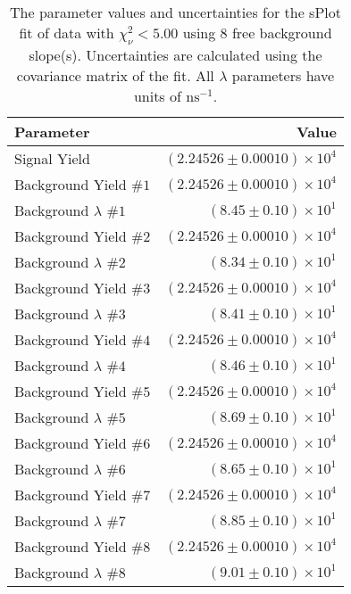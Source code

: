 
\begin{table}
    \begin{center}
        \begin{tabular}{lr}\toprule
            Parameter & Value \\\midrule
            Signal Yield & $(2.24526 \pm 0.00010) \times 10^{4}$ \\
            Background Yield $\#1$ & $(2.24526 \pm 0.00010) \times 10^{4}$ \\
            Background $\lambda$ $\#1$ & $(8.45 \pm 0.10) \times 10^{1}$ \\
            Background Yield $\#2$ & $(2.24526 \pm 0.00010) \times 10^{4}$ \\
            Background $\lambda$ $\#2$ & $(8.34 \pm 0.10) \times 10^{1}$ \\
            Background Yield $\#3$ & $(2.24526 \pm 0.00010) \times 10^{4}$ \\
            Background $\lambda$ $\#3$ & $(8.41 \pm 0.10) \times 10^{1}$ \\
            Background Yield $\#4$ & $(2.24526 \pm 0.00010) \times 10^{4}$ \\
            Background $\lambda$ $\#4$ & $(8.46 \pm 0.10) \times 10^{1}$ \\
            Background Yield $\#5$ & $(2.24526 \pm 0.00010) \times 10^{4}$ \\
            Background $\lambda$ $\#5$ & $(8.69 \pm 0.10) \times 10^{1}$ \\
            Background Yield $\#6$ & $(2.24526 \pm 0.00010) \times 10^{4}$ \\
            Background $\lambda$ $\#6$ & $(8.65 \pm 0.10) \times 10^{1}$ \\
            Background Yield $\#7$ & $(2.24526 \pm 0.00010) \times 10^{4}$ \\
            Background $\lambda$ $\#7$ & $(8.85 \pm 0.10) \times 10^{1}$ \\
            Background Yield $\#8$ & $(2.24526 \pm 0.00010) \times 10^{4}$ \\
            Background $\lambda$ $\#8$ & $(9.01 \pm 0.10) \times 10^{1}$ \\\bottomrule
        \end{tabular}
        \caption{The parameter values and uncertainties for the sPlot fit of data with $\chi^2_\nu < 5.00$ using 8 free background slope(s). Uncertainties are calculated using the covariance matrix of the fit. All $\lambda$ parameters have units of $\si{\nano\second}^{-1}$.}
    \end{center}
\end{table}
